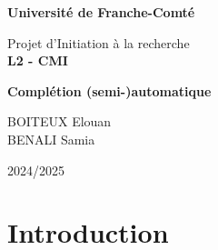\documentclass[a4paper, 11pt]{report}
\begin{document}
\begin{titlepage}
    \centering
    \vspace*{2cm}
    {\Huge \textbf{Université de Franche-Comté} \par}
    \vspace{1cm}
    {\huge \texttt{}{Projet d'Initiation à la recherche\\ } \LARGE{\textbf{L2 - CMI}} \par} 
    \vspace{1.2cm}
    {\huge \textbf{Complétion (semi-)automatique} \par}
    \vspace{1.5cm}
    {\Large BOITEUX Elouan\\BENALI Samia\par}
    \vspace{5cm}
    \begin{minipage}[c]{0.40\textwidth}
        \centering
    \end{minipage}
    \hfill
    \begin{minipage}[c]{0.5\textwidth}
        \centering
    \end{minipage}
    \vfill
    {2024/2025}
\end{titlepage}

\tableofcontents



\chapter*{Introduction} %
\end{document}
